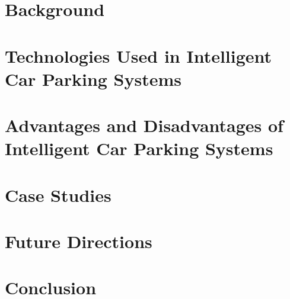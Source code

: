 \documentclass{article}
\begin{document}
\section*{Background}

\section*{Technologies Used in Intelligent Car Parking Systems}

\section*{Advantages and Disadvantages of Intelligent Car Parking Systems}

\section*{Case Studies}

\section*{Future Directions}

\section*{Conclusion}
\end{document}
